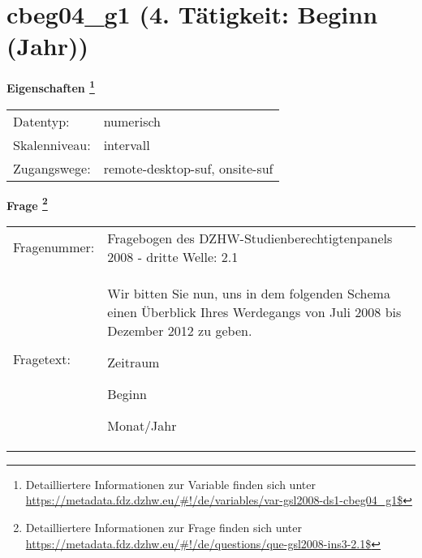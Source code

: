 
    \setcounter{footnote}{0}

    \vspace*{-1.8cm}
	\section{cbeg04\_g1 (4. Tätigkeit: Beginn (Jahr))}
	\label{section:cbeg04_g1}



    \vspace*{0.5cm}
    \noindent\textbf{Eigenschaften
	\footnote{Detailliertere Informationen zur Variable finden sich unter
		\url{https://metadata.fdz.dzhw.eu/\#!/de/variables/var-gsl2008-ds1-cbeg04_g1$}}}\\
	\begin{tabularx}{\hsize}{@{}lX}
	Datentyp: & numerisch \\
	Skalenniveau: & intervall \\
	Zugangswege: &
	  remote-desktop-suf, 
	  onsite-suf
 \\
    \end{tabularx}



				\vspace*{0.5cm}
                \noindent\textbf{Frage
	                \footnote{Detailliertere Informationen zur Frage finden sich unter
		              \url{https://metadata.fdz.dzhw.eu/\#!/de/questions/que-gsl2008-ins3-2.1$}}}\\
				\begin{tabularx}{\hsize}{@{}lX}
					Fragenummer: &
					  Fragebogen des DZHW-Studienberechtigtenpanels 2008 - dritte Welle:
					  2.1
 \\
					Fragetext: & Wir bitten Sie nun, uns in dem folgenden Schema einen Überblick Ihres Werdegangs von Juli 2008 bis Dezember 2012 zu geben.\par  Zeitraum\par  Beginn\par  Monat/Jahr \\
				\end{tabularx}





